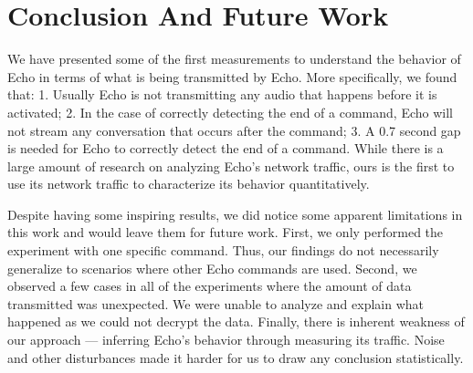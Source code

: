 \section{Conclusion And Future Work}
We have presented some of the first measurements to understand the behavior of Echo in terms of what is being transmitted by Echo. More specifically, we found that: 1. Usually Echo is not transmitting any audio that happens before it is activated; 2. In the case of correctly detecting the end of a command, Echo will not stream any conversation that occurs after the command; 3. A 0.7 second gap is needed for Echo to correctly detect the end of a command. While there is a large amount of research on analyzing Echo’s network traffic, ours is the first to use its network traffic to characterize its behavior quantitatively.

Despite having some inspiring results, we did notice some apparent limitations in this work and would leave them for future work. First, we only performed the experiment with one specific command. Thus, our findings do not necessarily generalize to scenarios where other Echo commands are used. Second, we observed a few cases in all of the experiments where the amount of data transmitted was unexpected. We were unable to analyze and explain what happened as we could not decrypt the data. Finally, there is inherent weakness of our approach --- inferring Echo's behavior through measuring its traffic. Noise and other disturbances made it harder for us to draw any conclusion statistically.